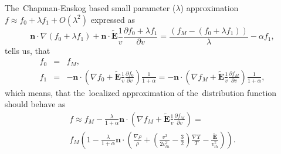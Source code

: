 \documentclass[review]{elsarticle}
\newcommand{\pdv}[2]{\frac{\partial{#1}}{\partial{#2}}}
\newcommand{\vect}[1]{\boldsymbol{#1}}
\newcommand{\dI}{\text{d}}
\newcommand{\mfp}{\lambda}
\newcommand{\vmag}{v}
\newcommand{\vth}{v_{th}}
\newcommand{\vn}{\vect{n}}
\newcommand{\tE}{\vect{\tilde{E}}}
\newcommand{\crs}{\sigma}
\newcommand{\fM}{f_M}
\begin{document}
The~Chapman-Enskog based small parameter ($\mfp$) approximation 
$f\approx f_0 + \lambda f_1 + O(\lambda^2)$ expressed as
\begin{equation}
  \vn\cdot\nabla (f_0 + \lambda f_1) +
  \vn\cdot\tE\frac{1}{\vmag}\pdv{f_0 + \lambda f_1 }{\vmag}= 
  \frac{\left(\fM - (f_0 + \lambda f_1)\right)}{\mfp} - \alpha f_1,
  \label{eq:CE_BGK}
\end{equation}
tells us, that
\begin{eqnarray}
  f_0 &=& \fM, 
  \nonumber\\
  f_1 &=& - \vn\cdot
  \left(\nabla f_0 + \tE\frac{1}{\vmag}\pdv{f_0}{\vmag} \right)
  \frac{1}{1 + \alpha} 
  = - \vn\cdot
  \left(\nabla\fM + \tE\frac{1}{\vmag}\pdv{\fM}{\vmag} \right)
  \frac{1}{1 + \alpha} ,
  \nonumber
\end{eqnarray}
which means, that the~localized approximation of the~distribution function
should behave as
\begin{multline}
  f \approx \fM - \frac{\mfp}{1 + \alpha}\vn\cdot
  \left(\nabla \fM + \tE\frac{1}{\vmag}
  \pdv{\fM}{\vmag} \right)  
  = \\
  \fM \left(1 - \frac{\mfp}{1 + \alpha}\vn\cdot
  \left(\frac{\nabla\rho}{\rho} + 
  \left( \frac{\vmag^2}{2 \vth^2} - \frac{3}{2}\right) \frac{\nabla T}{T} 
  - \frac{\tE}{\vth^2} \right) \right) .
  \label{eq:f_localized}
\end{multline}
 %
\end{document}
